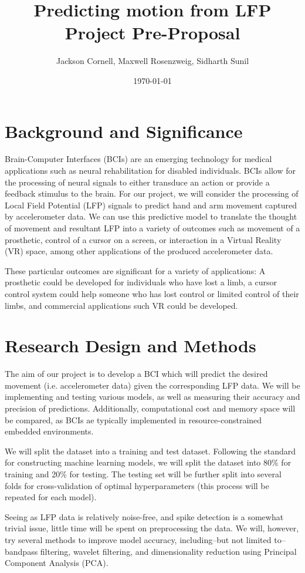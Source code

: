 \documentclass[12pt]{article}
\title{ Predicting motion from LFP Project Pre-Proposal }
\author{ Jackson Cornell, Maxwell Rosenzweig, Sidharth Sunil }
\date{\today}
\begin{document}
\maketitle

\section{Background and Significance}

Brain-Computer Interfaces (BCIs) are an emerging technology for medical applications such as neural rehabilitation for disabled individuals. BCIs allow for the processing of neural signals to either transduce an action or provide a feedback stimulus to the brain. For our project, we will consider the processing of Local Field Potential (LFP) signals to predict hand and arm movement captured by accelerometer data. We can use this predictive model to translate the thought of movement and resultant LFP into a variety of outcomes such as movement of a prosthetic, control of a cursor on a screen, or interaction in a Virtual Reality (VR) space, among other applications of the produced accelerometer data. 

These particular outcomes are significant for a variety of applications: A prosthetic could be developed for individuals who have lost a limb, a cursor control system could help someone who has lost control or limited control of their limbs, and commercial applications such VR could be developed.

\section{Research Design and Methods}
The aim of our project is to develop a BCI which will predict the desired movement (i.e. accelerometer data) given the corresponding LFP data. We will be implementing and testing various models, as well as measuring their accuracy and precision of predictions. Additionally, computational cost and memory space will be compared, as BCIs ae typically implemented in resource-constrained embedded environments.

We will split the dataset into a training and test dataset. Following the standard for constructing machine learning models, we will split the dataset into 80\% for training and 20\% for testing. The testing set will be further split into several folds for cross-validation of optimal hyperparameters (this process will be repeated for each model).

Seeing as LFP data is relatively noise-free, and spike detection is a somewhat trivial issue, little time will be spent on preprocessing the data. We will, however, try several methods to improve model accuracy, including--but not limited to--bandpass filtering, wavelet filtering, and dimensionality reduction using Principal Component Analysis (PCA).
\end{document}
